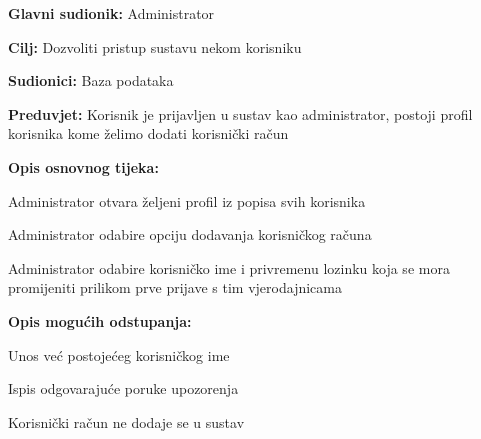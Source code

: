 			\noindent {}
			\begin{packed_item}
				
				\item \textbf{Glavni sudionik: }Administrator
				\item  \textbf{Cilj:} Dozvoliti pristup sustavu nekom korisniku
				\item  \textbf{Sudionici:} Baza podataka
				\item  \textbf{Preduvjet:} Korisnik je prijavljen u sustav kao administrator, postoji profil korisnika kome želimo dodati korisnički račun
				\item  \textbf{Opis osnovnog tijeka:}
				
				\item[] \begin{packed_enum}
					
					\item Administrator otvara željeni profil iz popisa svih korisnika
					\item Administrator odabire opciju dodavanja korisničkog računa
					\item Administrator odabire korisničko ime i privremenu lozinku koja se mora promijeniti prilikom prve prijave s tim vjerodajnicama
					
					
				\end{packed_enum}
			
				\item  \textbf{Opis mogućih odstupanja:}
				
				\item[] \begin{packed_item}
					
					\item[3.1] Unos već postojećeg korisničkog ime
					\item[] \begin{packed_enum}
						
						\item Ispis odgovarajuće poruke upozorenja
						\item Korisnički račun ne dodaje se u sustav
						
					\end{packed_enum}
					
				\end{packed_item}
				
			\end{packed_item}
		
